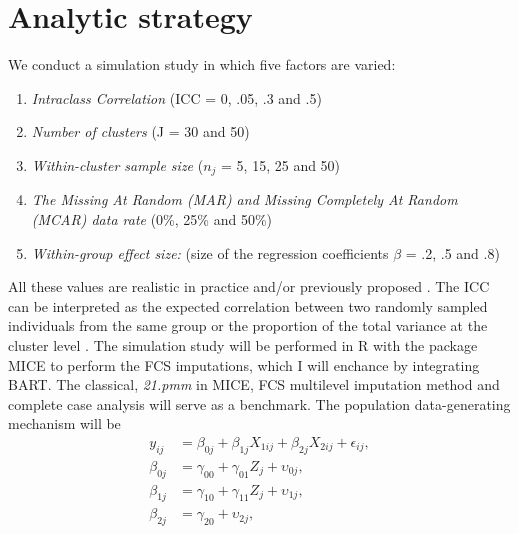 \documentclass[10pt, a4paper, titlepage]{article}
\begin{document}
\section{Analytic strategy}
We conduct a simulation study in which five factors are varied:
\begin{enumerate}
	\item \textit{Intraclass Correlation} (ICC = 0, .05, .3 and .5)
	\item \textit{Number of clusters} (J = 30 and 50)
	\item \textit{Within-cluster sample size}  ($n_{j}$ = 5, 15, 25 and 50)
	\item \textit{The Missing At Random (MAR) and Missing Completely At Random (MCAR) data rate} (0\%, 25\% and 50\%)
	\item \textit{Within-group effect size:} (size of the regression coefficients $\beta$ = .2, .5 and .8)
\end{enumerate}
All these values are realistic in practice and/or previously proposed \cite{gulliford1999, murray2003, hox2017, grund2018, enders2018a, enders2020}. The ICC can be interpreted as the expected correlation between two randomly sampled individuals from the same group or the proportion of the total variance at the cluster level \cite{gulliford2005, shieh2012, hox2017}. The simulation study will be performed in R with the package MICE \cite{buuren2011} to perform the FCS imputations, which I will enchance by integrating BART. The classical, \textit{21.pmm} in MICE,  FCS multilevel imputation method \cite{ludtke2017, enders2018a, enders2020} and complete case analysis will serve as a benchmark. The population data-generating mechanism will be
\begin{subequations}
\label{eq:population}
\begin{align}
y_{ij} &= \beta_{0j} + \beta_{1j}X_{1ij} + \beta_{2j}X_{2ij} + \epsilon_{ij}, \tag{1.1} \\
\beta_{0j} &= \gamma_{00} + \gamma_{01}Z_{j} + \upsilon_{0j}, \tag{1.2} \\
\beta_{1j} &= \gamma_{10} + \gamma_{11}Z_{j} + \upsilon_{1j}, \tag{1.3} \\
\beta_{2j} &= \gamma_{20} +  \upsilon_{2j}, \tag{1.4}
\end{align}
\end{subequations}
\end{document}
